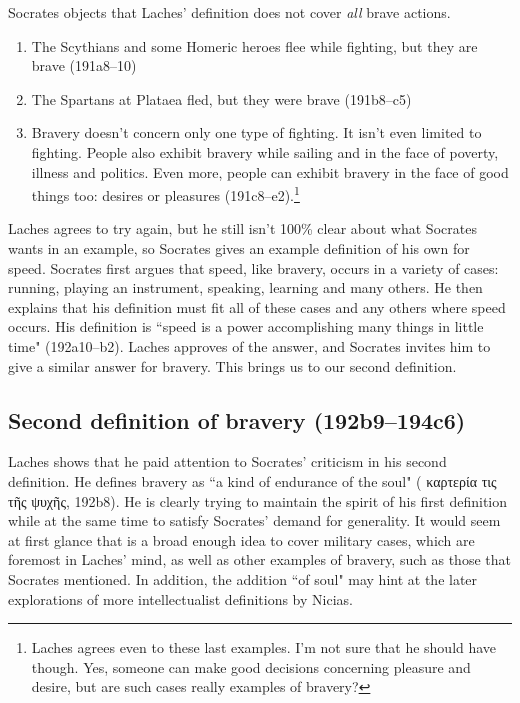 \documentclass[11pt]{article}
\begin{document}
Socrates objects that Laches' definition does not cover \emph{all} brave
actions.

\begin{enumerate}

    \item The Scythians and some Homeric heroes flee while fighting, but
        they are brave (191a8--10)

    \item The Spartans at Plataea fled, but they were brave (191b8--c5)

    \item Bravery doesn't concern only one type of fighting.  It isn't even
        limited to fighting.  People also exhibit bravery while sailing and
        in the face of poverty, illness and politics.  Even more, people
        can exhibit bravery in the face of good things too: desires or
        pleasures (191c8--e2).\footnote{Laches agrees even to these last
        examples.  I'm not sure that he should have though.  Yes, someone
        can make good decisions concerning pleasure and desire, but are
        such cases really examples of bravery?}

\end{enumerate}

Laches agrees to try again, but he still isn't 100\% clear about what
Socrates wants in an example, so Socrates gives an example definition of
his own for speed.  Socrates first argues that speed, like bravery, occurs
in a variety of cases: running, playing an instrument, speaking, learning
and many others.  He then explains that his definition must fit all of
these cases and any others where speed occurs.  His definition is ``speed
is a power accomplishing many things in little time" (192a10--b2).  Laches
approves of the answer, and Socrates invites him to give a similar answer
for bravery.  This brings us to our second definition.


\subsection{Second definition of bravery (192b9--194c6)}

Laches shows that he paid attention to Socrates' criticism in his second
definition.  He defines bravery as ``a kind of endurance of the soul" ({\g
καρτερία τις τῆς ψυχῆς}, 192b8).  He is clearly trying to maintain the
spirit of his first definition while at the same time to satisfy Socrates'
demand for generality.  It would seem at first glance that 
is a broad enough idea to cover military cases, which are foremost in
Laches' mind, as well as other examples of bravery, such as those that
Socrates mentioned.  In addition, the addition ``of soul" may hint at the
later explorations of more intellectualist definitions by Nicias.
\end{document}
